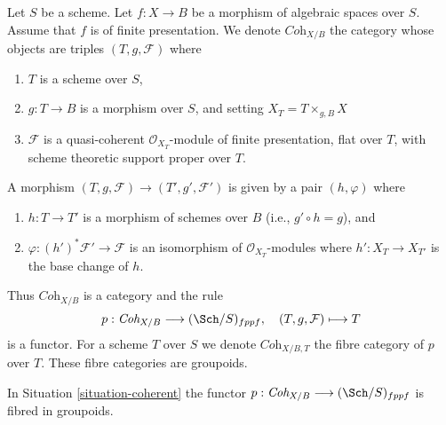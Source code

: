 \begin{situation}
\label{situation-coherent}
Let $S$ be a scheme. Let $f : X \to B$ be a morphism of algebraic spaces
over $S$. Assume that $f$ is of finite presentation.
We denote $\textit{Coh}_{X/B}$ the category whose objects are
triples $(T, g, \mathcal{F})$ where
\begin{enumerate}
\item $T$ is a scheme over $S$,
\item $g : T \to B$ is a morphism over $S$, and setting
$X_T = T \times_{g, B} X$
\item $\mathcal{F}$ is a quasi-coherent $\mathcal{O}_{X_T}$-module
of finite presentation, flat over $T$, with scheme theoretic support
proper over $T$.
\end{enumerate}
A morphism $(T, g, \mathcal{F}) \to (T', g', \mathcal{F}')$
is given by a pair $(h, \varphi)$ where
\begin{enumerate}
\item $h : T \to T'$ is a morphism of schemes over $B$
(i.e., $g' \circ h = g$), and
\item $\varphi : (h')^*\mathcal{F}' \to \mathcal{F}$ is an
isomorphism of $\mathcal{O}_{X_T}$-modules where $h' : X_T \to X_{T'}$
is the base change of $h$.
\end{enumerate}
\end{situation}

\noindent
Thus $\textit{Coh}_{X/B}$ is a category and the rule
$$
p : \textit{Coh}_{X/B} \longrightarrow (\Sch/S)_{fppf},
\quad
(T, g, \mathcal{F}) \longmapsto T
$$
is a functor. For a scheme $T$ over $S$ we denote $\textit{Coh}_{X/B, T}$
the fibre category of $p$ over $T$. These fibre categories are groupoids.

\begin{lemma}
\label{lemma-coherent-fibred-in-groupoids}
In Situation \ref{situation-coherent} the functor
$p : \textit{Coh}_{X/B} \longrightarrow (\Sch/S)_{fppf}$
is fibred in groupoids.
\end{lemma}

